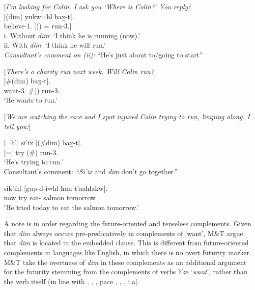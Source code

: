 \documentclass[output=paper]{langscibook}
\begin{document}
\begin{exe}
\ex \label{Todoro19} [\emph{I’m looking for Colin. I ask you ‘Where is Colin?’ You reply:}] \\
 	[({dim})	{yukw=hl}	{bax̱-t}].  \\
    believe-1{\sg}.{\seriesII}	[()	={\cn}	run-3.{\seriesII}]\\
\glt 	i. 	Without {\emph{dim}}:	‘I think he is running (now).’ \\
		ii. 	With {\emph{dim}}:	‘I think he will run.’  \\
		\emph{	Consultant’s comment on (ii):} ``He’s just about to/going to start''
\end{exe}

\begin{exe}
\ex \label{Todoro20} [\emph{There’s a charity run next week. Will Colin run?}] \\
	[\#({dim})	{bax̱-t}].	 \\
    want-3.{\seriesII}	 \#()	run-3.{\seriesII}\\
\glt `He wants to run.' 
\end{exe}

\begin{exe}
\ex \label{Todoro21} [\emph{We are watching the race and I spot injured Colin trying to run, limping along. I tell you:}] 
\begin{xlist}

\ex \label{Todoro21a}
[={hl}]	{si'ix} 	[(\#{dim}) 	{bax̱-t}].	  \\
    [={\cn}]	try	 (\#)	run-3.{\seriesII}\\
\glt ‘He’s trying to run.’	\\             
		Consultant’s comment: \emph{“Si'ix} and {\emph{dim}} don’t go together.”


\ex \label{Todoro21b}
  {sik’ihl}    [{gup-d-i=hl} {hun}  {t’aahlakw}]. \\
    now       try        eat-       salmon	tomorrow\\
\glt `He tried today to eat the salmon tomorrow.' 

\end{xlist}
\end{exe}

A note is in order regarding the future-oriented and tenseless complements. Given that \emph{dim} always occurs pre-predicatively in complements of ‘want’, M\&T argue that \emph{dim} is located in the embedded clause. This is different from future-oriented complements in languages like English, in which there is no overt futurity marker. M\&T take the overtness of \emph{dim} in these complements as an additional argument for the futurity stemming from the complements of verbs like ‘\emph{want}’, rather than the verb itself (in line with \citealt{abusch2004a}, \citealt{wurmbrand2014a}, \citealt{todoroviwurmbrand2020b}, pace \citealt{ogihara1996a}, \citealt{abusch1997a}, \citealt{pearson2017a}, i.a).	
\end{document}
